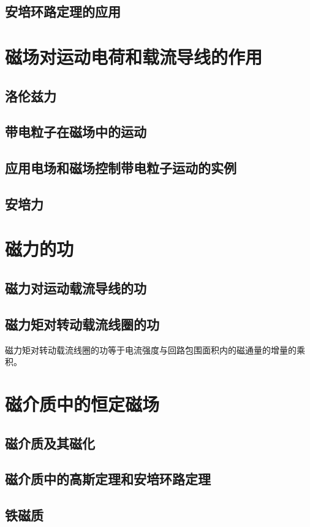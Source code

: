     \subsection{安培环路定理的应用}

\section{磁场对运动电荷和载流导线的作用}
    \subsection{洛伦兹力}
    \subsection{带电粒子在磁场中的运动}
    \subsection{应用电场和磁场控制带电粒子运动的实例}
    \subsection{安培力}

\section{磁力的功}
    \subsection{磁力对运动载流导线的功}
    \subsection{磁力矩对转动载流线圈的功}
    磁力矩对转动载流线圈的功等于电流强度与回路包围面积内的磁通量的增量的乘积。

\section{磁介质中的恒定磁场}
    \subsection{磁介质及其磁化}
    \subsection{磁介质中的高斯定理和安培环路定理}
    \subsection{铁磁质}

